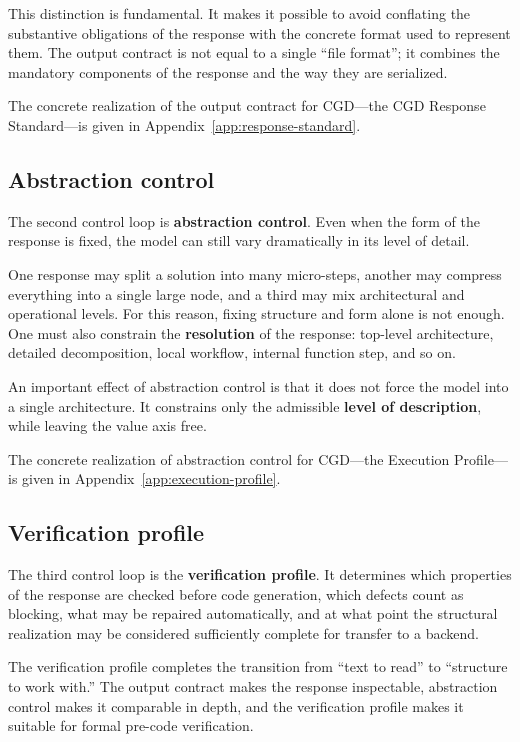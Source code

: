 \documentclass[12pt,a4paper]{article}
\begin{document}
This distinction is fundamental. It makes it possible to avoid conflating the substantive obligations of the response with the concrete format used to represent them. The output contract is not equal to a single ``file format''; it combines the mandatory components of the response and the way they are serialized.

The concrete realization of the output contract for CGD---the CGD Response Standard---is given in Appendix~\ref{app:response-standard}.

\subsection{Abstraction control}

The second control loop is \textbf{abstraction control}. Even when the form of the response is fixed, the model can still vary dramatically in its level of detail.

One response may split a solution into many micro-steps, another may compress everything into a single large node, and a third may mix architectural and operational levels. For this reason, fixing structure and form alone is not enough. One must also constrain the \textbf{resolution} of the response: top-level architecture, detailed decomposition, local workflow, internal function step, and so on.

An important effect of abstraction control is that it does not force the model into a single architecture. It constrains only the admissible \textbf{level of description}, while leaving the value axis free.

The concrete realization of abstraction control for CGD---the Execution Profile---is given in Appendix~\ref{app:execution-profile}.

\subsection{Verification profile}

The third control loop is the \textbf{verification profile}. It determines which properties of the response are checked before code generation, which defects count as blocking, what may be repaired automatically, and at what point the structural realization may be considered sufficiently complete for transfer to a backend.

The verification profile completes the transition from ``text to read'' to ``structure to work with.'' The output contract makes the response inspectable, abstraction control makes it comparable in depth, and the verification profile makes it suitable for formal pre-code verification.
\end{document}

